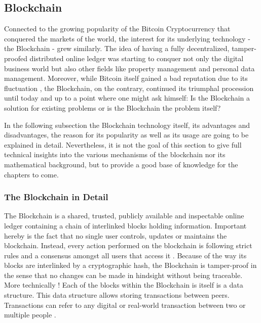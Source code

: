 \subsection{Blockchain}
\label{subsec:02_blockchain}

Connected to the growing popularity of the Bitcoin Cryptocurrency that conquered the markets of the world, the interest for its underlying technology - the Blockchain - grew similarly. The idea of having a fully decentralized, tamper-proofed distributed online ledger was starting to conquer not only the digital business world but also other fields like property management and personal data management. Moreover, while Bitcoin itself gained a bad reputation due to its fluctuation \cite{Shackelford2016}, the Blockchain, on the contrary, continued its triumphal procession until today and up to a point where one might ask himself: Is the Blockchain a solution for existing problems or is the Blockchain the problem itself? \cite{Stinchcombe2017} \cite{Nielsen2018} \cite{Lunn2015}

In the following subsection the Blockchain technology itself, its advantages and disadvantages, the reason for its popularity as well as its usage are going to be explained in detail. Nevertheless, it is not the goal of this section to give full technical insights into the various mechanisms of the blockchain nor its mathematical background, but to provide a good base of knowledge for the chapters to come.

\subsubsection{The Blockchain in Detail}
The Blockchain is a shared, trusted, publicly available and inspectable online ledger containing a chain of interlinked blocks holding information. Important hereby is the fact that no single user controls, updates or maintains the blockchain. Instead, every action performed on the blockchain is following strict rules and a consensus amongst all users that access it \cite{Shackelford2016}. Because of the way its blocks are interlinked by a cryptographic hash, the Blockchain is tamper-proof in the sense that no changes can be made in hindsight without being traceable.
More technically \cite{BenAyed2017}!
Each of the blocks within the Blockchain is itself is a data structure.  This data structure allows storing transactions between peers. Transactions can refer to any digital or real-world transaction between two or multiple people \cite{Wust2017}.



